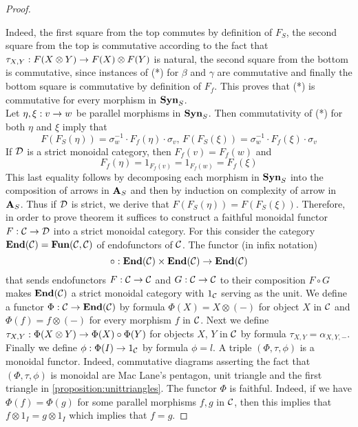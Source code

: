\begin{proof}
\begin{center}
\end{center}
Indeed, the first square from the top commutes by definition of $F_S$, the second square from the top is commutative according to the fact that $\tau_{X,Y}:F(X\otimes Y)\rightarrow F(X)\otimes F(Y)$ is natural, the second square from the bottom is commutative, since instances of (*) for $\beta$ and $\gamma$ are commutative and finally the bottom square is commutative by definition of $F_f$. This proves that (*) is commutative for every morphism in $\mathbf{Syn}_S$.\\
Let $\eta, \xi:v\rightarrow w$ be parallel morphisms in $\mathbf{Syn}_S$. Then commutativity of (*) for both $\eta$ and $\xi$ imply that
$$F(F_S(\eta)) = \sigma_w^{-1}\cdot F_f(\eta)\cdot \sigma_v,\,F(F_S(\xi)) = \sigma_w^{-1}\cdot F_f(\xi)\cdot \sigma_v$$
If ${\mathcal D}$ is a strict monoidal category, then $F_f(v) = F_f(w)$ and
$$F_f(\eta) = 1_{F_f(v)}=1_{F_f(w)}= F_f(\xi)$$
This last equality follows by decomposing each morphism in $\mathbf{Syn}_S$ into the composition of arrows in $\mathbf{A}_S$ and then by induction on complexity of arrow in $\mathbf{A}_S$. Thus if ${\mathcal D}$ is strict, we derive that $F(F_S(\eta)) = F(F_S(\xi))$. Therefore, in order to prove theorem it suffices to construct a faithful monoidal functor $F:{\mathcal C}\rightarrow {\mathcal D}$ into a strict monoidal category. For this consider the category $\mathbf{End}({\mathcal C}) = \mathbf{Fun}({\mathcal C},{\mathcal C})$ of endofunctors of ${\mathcal C}$. The functor (in infix notation)
$$\circ:\mathbf{End}({\mathcal C})\times \mathbf{End}({\mathcal C})\rightarrow \mathbf{End}({\mathcal C})$$
that sends endofunctors $F:{\mathcal C}\rightarrow {\mathcal C}$ and $G:{\mathcal C}\rightarrow {\mathcal C}$ to their composition $F\circ G$ makes $\mathbf{End}({\mathcal C})$ a strict monoidal category with $1_{{\mathcal C}}$ serving as the unit. We define a functor $\Phi:{\mathcal C}\rightarrow \mathbf{End}({\mathcal C})$ by formula $\Phi(X) = X\otimes (-)$ for object $X$ in ${\mathcal C}$ and $\Phi(f) = f\otimes(-)$ for every morphism $f$ in ${\mathcal C}$. Next we define $\tau_{X,Y}:\Phi(X\otimes Y)\rightarrow \Phi(X)\circ \Phi(Y)$ for objects $X$, $Y$ in ${\mathcal C}$ by formula $\tau_{X,Y} = \alpha_{X,Y,-}$. Finally we define $\phi:\Phi(I)\rightarrow 1_{{\mathcal C}}$ by formula $\phi = l$. A triple $(\Phi,\tau,\phi)$ is a monoidal functor. Indeed, commutative diagrams asserting the fact that $(\Phi,\tau,\phi)$ is monoidal are Mac Lane's pentagon, unit triangle and the first triangle in \ref{proposition:unittriangles}. The functor $\Phi$ is faithful. Indeed, if we have $\Phi(f) = \Phi(g)$ for some parallel morphisms $f, g$ in ${\mathcal C}$, then this implies that $f\otimes 1_I = g\otimes 1_I$ which implies that $f=g$.
\end{proof}

